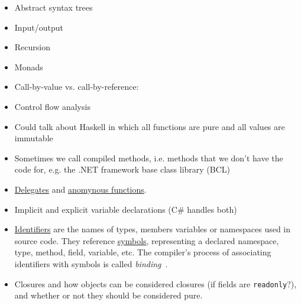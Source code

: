 \documentclass[a4paper,12pt]{article}
\begin{document}
\begin{itemize}
  \item Abstract syntax trees
  \item Input/output
  \item Recursion
  \item Monads
  \item Call-by-value vs. call-by-reference: %
  \item Control flow analysis
  \item Could talk about Haskell in which all functions are pure and all values are immutable
  \item Sometimes we call compiled methods, i.e. methods that we don’t have the code for, e.g. the .NET framework base class library (BCL)
  \item \href{https://docs.microsoft.com/en-us/dotnet/csharp/programming-guide/delegates/}{Delegates} and \href{https://docs.microsoft.com/en-us/dotnet/csharp/programming-guide/statements-expressions-operators/anonymous-functions}{anomynous functions}.
  \item Implicit and explicit variable declarations (C\# handles both)
  \item \href{https://docs.microsoft.com/en-us/dotnet/csharp/programming-guide/inside-a-program/identifier-names}{Identifiers} are the names of types, members variables or namespaces used in source code. They reference \href{https://docs.microsoft.com/en-us/dotnet/csharp/roslyn-sdk/work-with-semantics#symbols}{symbols}, representing a declared namespace, type, method, field, variable, etc. The compiler's process of associating identifiers with symbols is called \textit{binding}~\cite{microsoft-semantic-analysis}. %
  \item Closures and how objects can be considered closures (if fields are \texttt{readonly}?), and whether or not they should be considered pure.
\end{itemize}
\end{document}
